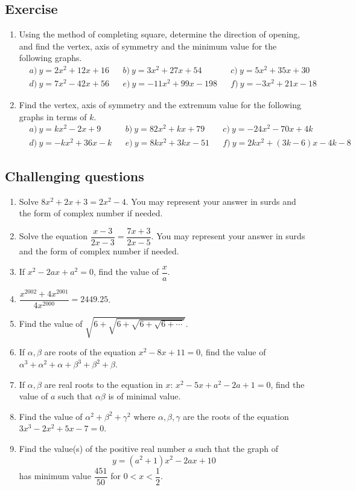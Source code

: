 \documentclass[12pt]{article}
\begin{document}
    \subsection*{Exercise}
    \begin{enumerate}
        \item Using the method of completing square, determine the direction of opening, and find the vertex, axis of symmetry and the minimum value for the following graphs.\begin{align*}
            &a)\ y=2x^2+12x+16&&b)\ y=3x^2+27x+54&&c)\ y=5x^2+35x+30\\
            &d)\ y=7x^2-42x+56&&e)\ y=-11x^2+99x-198&&f)\ y=-3x^2+21x-18
        \end{align*}
        \item Find the vertex, axis of symmetry and the extremum value for the following graphs in terms of $k$.\begin{align*}
            &a)\ y=kx^2-2x+9&&b)\ y=82x^2+kx+79&&c)\ y=-24x^2-70x+4k\\
            &d)\ y=-kx^2+36x-k&&e)\ y=8kx^2+3kx-51&&f)\ y=2kx^2+(3k-6)x-4k-8
        \end{align*}
    \end{enumerate}

    \pagebreak

    \subsection*{Challenging questions}
    \begin{enumerate}
        \item Solve $8x^2+2x+3=2x^2-4$. You may represent your answer in surds and the form of complex number if needed.
        \item Solve the equation $\dfrac{x-3}{2x-3}=\dfrac{7x+3}{2x-5}$. You may represent your answer in surds and the form of complex number if needed.
        \item If $x^2-2ax+a^2=0$, find the value of $\dfrac{x}{a}$.
        \item $\dfrac{x^{2002}+4x^{2001}}{4x^{2000}}=2449.25$.
        \item Find the value of $\sqrt{6+\sqrt{6+\sqrt{6+\sqrt{6+\cdots}}}}$.
        \item If $\alpha,\beta$ are roots of the equation $x^2-8x+11=0$, find the value of $\alpha^3+\alpha^2+\alpha+\beta^3+\beta^2+\beta$.
        \item If $\alpha,\beta$ are real roots to the equation in $x$: $x^2-5x+a^2-2a+1=0$, find the value of $a$ such that $\alpha\beta$ is of minimal value.
        \item Find the value of $\alpha^2+\beta^2+\gamma^2$ where $\alpha,\beta,\gamma$ are the roots of the equation $3x^3-2x^2+5x-7=0$.
        \item Find the value(s) of the positive real number $a$ such that the graph of $$y=(a^2+1)x^2-2ax+10$$ has minimum value $\dfrac{451}{50}$ for $0<x<\dfrac{1}{2}$.
    \end{enumerate}
\end{document}

